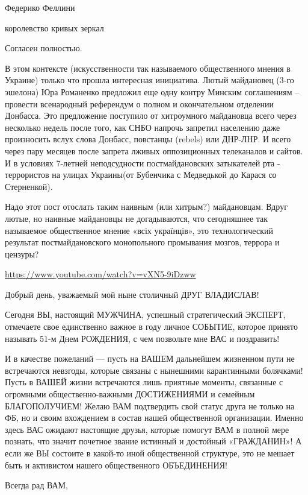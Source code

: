 \begin{itemize}
Федерико Феллини

королевство кривых зеркал


Согласен полностью.

В этом контексте (искусственности так называемого общественного мнения в
Украине) только что прошла интересная инициатива. Лютый майдановец (3-го
эшелона) Юра Романенко предложил еще одну контру Минским соглашениям – провести
всенародный референдум о полном и окончательном отделении Донбасса. Это
предложение поступило от хитроумного майдановца всего через несколько недель
после того, как СНБО напрочь запретил населению даже произносить вслух слова
Донбасс, повстанцы (rebels) или ДНР-ЛНР. И всего через пару месяцев после
запрета лживых оппозиционных телеканалов и сайтов. И в условиях 7-летней
неподсудности постмайдановских затыкателей рта - террористов на улицах
Украины(от Бубенчика с Медведькой до Карася со Стерненкой).

Надо этот пост отослать таким наивным (или хитрым?) майдановцам. Вдруг лютые,
но наивные майдановцы не догадываются, что сегодняшнее так называемое
общественное мнение «всіх українців», это технологический результат
постмайдановского монопольного промывания мозгов, террора и цензуры?

\url{https://www.youtube.com/watch?v=vXN5-9iDzww}


Добрый день, уважаемый мой ныне столичный ДРУГ ВЛАДИСЛАВ!

Сегодня ВЫ, настоящий МУЖЧИНА, успешный стратегический ЭКСПЕРТ, отмечаете свое
единственно важное в году личное СОБЫТИЕ, которое принято называть 51-м Днем
РОЖДЕНИЯ, с чем позвольте мне ВАС и поздравить!

И в качестве пожеланий — пусть на ВАШЕМ дальнейшем жизненном пути не
встречаются невзгоды, которые связаны с нынешними карантинными болячками! Пусть
в ВАШЕЙ жизни встречаются лишь приятные моменты, связанные с огромными
общественно-важными ДОСТИЖЕНИЯМИ и семейным БЛАГОПОЛУЧИЕМ! Желаю ВАМ
подтвердить свой статус друга не только на ФБ, но и своим вхождением в состав
нашей общественной организации. Именно здесь ВАС ожидают настоящие друзья,
которые помогут ВАМ в полной мере познать, что значит почетное звание истинный
и достойный «ГРАЖДАНИН»! А если же ВЫ состоите в какой-то иной общественной
структуре, это не мешает быть и активистом нашего общественного ОБЪЕДИНЕНИЯ!

Всегда рад ВАМ,


\end{itemize}
